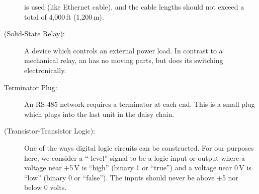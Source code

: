 \documentclass[letterpaper,twoside,onecolumn,openright,final]{memoir}
\begin{document}
\begin{description}
		is used (like Ethernet cable), and the cable lengths should not exceed a total of 4,000\,ft
		(1,200\,m).
	\item[\acronym{SSR} (Solid-State Relay):] A device which controls an external power load.  In
		contrast to a mechanical relay, an  has no moving parts, but does its switching
		electronically.
	\item[Terminator Plug:]
		An RS-485 network requires a terminator at each end.  This is a small plug which plugs into
		the last unit in the daisy chain.
	\item[\acronym{TTL} (Transistor-Transistor Logic):] One of the ways digital logic circuits can be
		constructed.  For our purposes here, we consider a ``-level'' signal to be a
		logic input or output where a voltage near +5\,V is ``high'' (binary 1 or ``true'') and a
		voltage near 0\,V is ``low'' (binary 0 or ``false'').  The inputs should never be above
		+5 nor below 0 volts.
\end{description}



\indexintoc
\printindex
\clearpage


\end{document}
